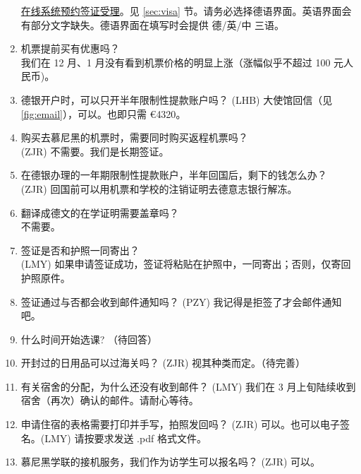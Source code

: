 \documentclass[oneside,final]{book}
\begin{document}
\begin{enumerate}
  \href{https://service2.diplo.de/rktermin/extern/choose_category.do?locationCode=peki&realmId=12&categoryId=156&request_locale=de}{在线系统预约签证受理}。见 \ref{sec:visa} 节。请务必选择德语界面。英语界面会有部分文字缺失。德语界面在填写时会提供 德/英/中 三语。
  \item 机票提前买有优惠吗？ \\
  我们在 12 月、1 月没有看到机票价格的明显上涨（涨幅似乎不超过 100 元人民币)。
  \item 德银开户时，可以只开半年限制性提款账户吗？
  (LHB) 大使馆回信（见 \ref{fig:email}），可以。也即只需 \euro{4320}。
  \item 购买去慕尼黑的机票时，需要同时购买返程机票吗？ \\
  (ZJR) 不需要。我们是长期签证。
  \item 在德银办理的一年期限制性提款账户，半年回国后，剩下的钱怎么办？ \\
  (ZJR) 回国前可以用机票和学校的注销证明去德意志银行解冻。
  \item 翻译成德文的在学证明需要盖章吗？ \\
  不需要。
  \item 签证是否和护照一同寄出？ \\
  (LMY) 如果申请签证成功，签证将粘贴在护照中，一同寄出；否则，仅寄回护照原件。
  \item 签证通过与否都会收到邮件通知吗？
  (PZY) 我记得是拒签了才会邮件通知吧。
  \item 什么时间开始选课?
  （待回答）
  \item 开封过的日用品可以过海关吗？
  (ZJR) 视其种类而定。（待完善）
  \item 有关宿舍的分配，为什么还没有收到邮件？
  (LMY) 我们在 3 月上旬陆续收到宿舍（再次）确认的邮件。请耐心等待。
  \item 申请住宿的表格需要打印并手写，拍照发回吗？
  (ZJR) 可以。也可以电子签名。(LMY) 请按要求发送 .pdf 格式文件。
  \item 慕尼黑学联的接机服务，我们作为访学生可以报名吗？
  (ZJR) 可以。


\end{enumerate}
\end{document}
